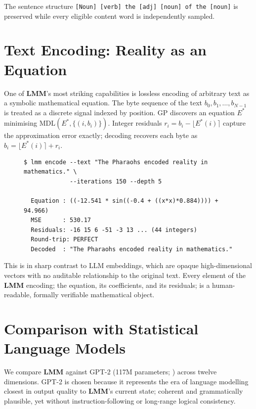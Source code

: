 \documentclass[11pt,a4paper]{article}
\newcommand{\lmm}{\texorpdfstring{%
  \textbf{\color{lmmAccent}LMM}}{LMM}}
\begin{document}
\noindent The sentence structure \texttt{[Noun] [verb] the [adj] [noun] of the [noun]} is preserved while every eligible content word is independently sampled.

\section{Text Encoding: Reality as an Equation}
\label{sec:encode}

One of \lmm{}'s most striking capabilities is lossless encoding of arbitrary text as a symbolic mathematical equation. The byte sequence of the text $b_0, b_1, \ldots, b_{N-1}$ is treated as a discrete signal indexed by position. GP discovers an equation $E^*$ minimising $\text{MDL}(E^*, \{(i, b_i)\})$. Integer residuals $r_i = b_i - \lfloor E^*(i) \rceil$ capture the approximation error exactly; decoding recovers each byte as $b_i = \lfloor E^*(i) \rceil + r_i$.

\begin{figure}[H]
\begin{lstlisting}[style=code, caption={Encoding and lossless round-trip decoding}]
$ lmm encode --text "The Pharaohs encoded reality in mathematics." \
             --iterations 150 --depth 5

  Equation : ((-12.541 * sin((-0.4 + ((x*x)*0.884)))) + 94.966)
  MSE      : 530.17
  Residuals: -16 15 6 -51 -3 13 ... (44 integers)
  Round-trip: PERFECT
  Decoded  : "The Pharaohs encoded reality in mathematics."
\end{lstlisting}
\end{figure}

This is in sharp contrast to LLM embeddings, which are opaque high-dimensional vectors with no auditable relationship to the original text. Every element of the \lmm{} encoding; the equation, its coefficients, and its residuals; is a human-readable, formally verifiable mathematical object.

\section{Comparison with Statistical Language Models}
\label{sec:compare}

We compare \lmm{} against GPT-2 (117M parameters; \citealt{radford2019language}) across twelve dimensions. GPT-2 is chosen because it represents the era of language modelling closest in output quality to \lmm{}'s current state; coherent and grammatically plausible, yet without instruction-following or long-range logical consistency.
\end{document}

